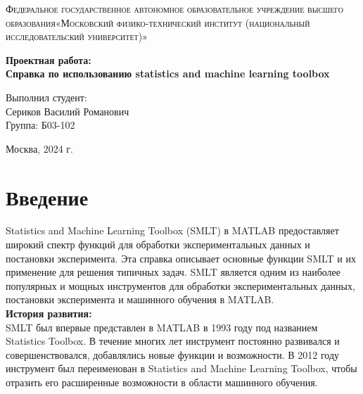 \documentclass[a4paper, 12pt]{article}%
\begin{document}
	\begin{titlepage}
		\begin{center}
			\textsc{Федеральное государственное автономное образовательное учреждение высшего образования«Московский физико-технический институт (национальный исследовательский университет)»\\[5mm]
			}
			
			\vfill
			
			\textbf{Проектная работа: \\[3mm]
				Справка по использованию statistics and machine learning toolbox
				\\[50mm]
			}
			
		\end{center}
		
		\hfill
		\begin{minipage}{.5\textwidth}
			Выполнил студент:\\[2mm]
			Сериков Василий Романович\\[2mm]
			Группа: Б03-102\\[5mm]
			
		\end{minipage}
		\vfill
		\begin{center}
			Москва, 2024 г.
		\end{center}
		
	\setcounter{page}{1}	
	\newpage
	\tableofcontents
	\newpage
	\section{Введение}
	\hspace{\parindent} Statistics and Machine Learning Toolbox (SMLT) в MATLAB предоставляет широкий спектр функций для обработки экспериментальных данных и постановки эксперимента. Эта справка описывает основные функции SMLT и их применение для решения типичных задач.
	SMLT является одним из наиболее популярных и мощных инструментов для обработки экспериментальных данных, постановки эксперимента и машинного обучения в MATLAB.\\
	
	\textbf{История развития:}\\
	SMLT был впервые представлен в MATLAB в 1993 году под названием Statistics Toolbox. В течение многих лет инструмент постоянно развивался и совершенствовался, добавлялись новые функции и возможности. В 2012 году инструмент был переименован в Statistics and Machine Learning Toolbox, чтобы отразить его расширенные возможности в области машинного обучения.\\
	

\end{titlepage}
\end{document}
